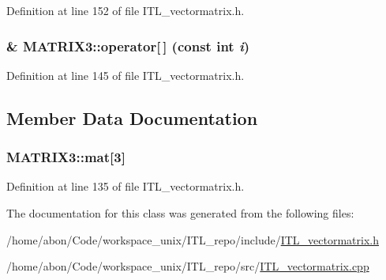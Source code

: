 Definition at line 152 of file ITL\_\-vectormatrix.h.

\hypertarget{classMATRIX3_a568cfeb7a853e8f1c6437046ab6c5cb1}{
\subsubsection[{operator[]}]{\& MATRIX3::operator\mbox{[}$\,$\mbox{]} (const int {\em i})}}
\label{classMATRIX3_a568cfeb7a853e8f1c6437046ab6c5cb1}


Definition at line 145 of file ITL\_\-vectormatrix.h.



\subsection{Member Data Documentation}
\hypertarget{classMATRIX3_ad05b011bf87af20da045df5640013017}{
\subsubsection[{mat}]{ {\bf MATRIX3::mat}\mbox{[}3\mbox{]}}}
\label{classMATRIX3_ad05b011bf87af20da045df5640013017}


Definition at line 135 of file ITL\_\-vectormatrix.h.



The documentation for this class was generated from the following files:\begin{DoxyCompactItemize}
\item 
/home/abon/Code/workspace\_\-unix/ITL\_\-repo/include/\hyperlink{ITL__vectormatrix_8h}{ITL\_\-vectormatrix.h}\item 
/home/abon/Code/workspace\_\-unix/ITL\_\-repo/src/\hyperlink{ITL__vectormatrix_8cpp}{ITL\_\-vectormatrix.cpp}\end{DoxyCompactItemize}
